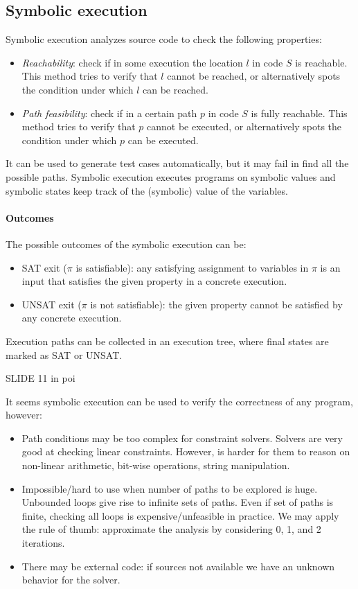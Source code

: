 \subsection{Symbolic execution}
Symbolic execution analyzes source code to check the following properties: 
\begin{itemize}
    \item \textit{Reachability}: check if in some execution the location $l$ in code $S$ is reachable. 
        This method tries to verify that $l$ cannot be reached, or alternatively spots the condition under which $l$ can be reached. 
    \item \textit{Path feasibility}: check if in a certain path $p$ in code $S$ is fully reachable. 
        This method tries to verify that $p$ cannot be executed, or alternatively spots the condition under which $p$ can be executed. 
\end{itemize} 
It can be used to generate test cases automatically, but it may fail in find all the possible paths. 
Symbolic execution executes programs on symbolic values and symbolic states keep track of the (symbolic) value of the variables. 

\paragraph*{Outcomes}
The possible outcomes of the symbolic execution can be: 
\begin{itemize}
    \item SAT exit ($\pi$ is satisfiable): any satisfying assignment to variables in $\pi$ is an input that satisfies the given property in a concrete execution.
    \item UNSAT exit ($\pi$ is not satisfiable): the given property cannot be satisfied by any concrete execution. 
\end{itemize}
Execution paths can be collected in an execution tree, where final states are marked as SAT or UNSAT. 
\begin{example}
    SLIDE 11 in poi 
\end{example}
It seems symbolic execution can be used to verify the correctness of any program, however: 
\begin{itemize}
    \item Path conditions may be too complex for constraint solvers. 
        Solvers are very good at checking linear constraints.
        However, is harder for them to reason on non-linear arithmetic, bit-wise operations, string manipulation.
    \item Impossible/hard to use when number of paths to be explored is huge.  
        Unbounded loops give rise to infinite sets of paths. 
        Even if set of paths is finite, checking all loops is expensive/unfeasible in practice.
        We may apply the rule of thumb: approximate the analysis by considering 0, 1, and 2 iterations. 
    \item There may be external code: if sources not available we have an unknown behavior for the solver. 
\end{itemize}